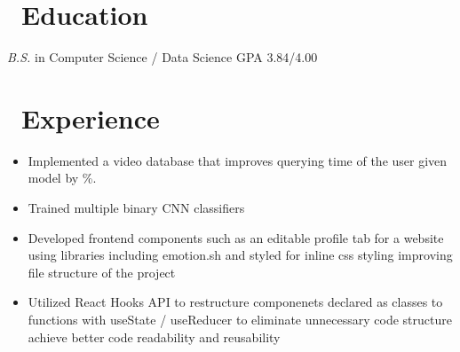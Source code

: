 \documentclass{resume}
\begin{document}



\section{\faGraduationCap\ Education}
\textit{B.S.} in Computer Science / Data Science \hfill GPA 3.84/4.00 

\section{\faUsers\ Experience}
\vspace{-1ex}
\begin{itemize}
	\item Implemented a video database that improves querying time of the user given model by \%.
	\item Trained multiple binary CNN classifiers 
\end{itemize}

\vspace{-1ex}
\begin{itemize}
	\item Developed frontend components such as an editable profile tab for a website using libraries including emotion.sh and styled for inline css styling improving file structure of the project
	\item Utilized React Hooks API to restructure componenets declared as classes to functions with useState / useReducer to eliminate unnecessary code structure achieve better code readability and reusability
\end{itemize}
\end{document}
